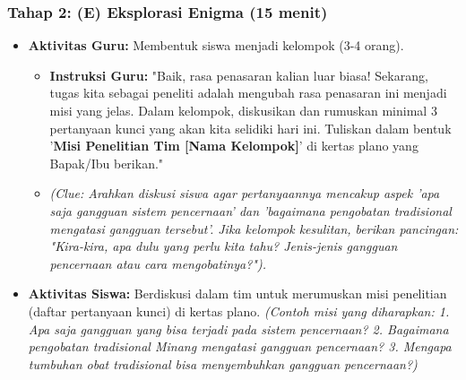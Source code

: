 \documentclass[a4paper,12pt]{article}
\begin{document}
\subsubsection{Tahap 2: (E) Eksplorasi Enigma (15 menit)}
\begin{itemize}
\item \textbf{Aktivitas Guru:} Membentuk siswa menjadi kelompok (3-4 orang).
    \begin{itemize}
    \item \textbf{Instruksi Guru:} "Baik, rasa penasaran kalian luar biasa! Sekarang, tugas kita sebagai peneliti adalah mengubah rasa penasaran ini menjadi misi yang jelas. Dalam kelompok, diskusikan dan rumuskan minimal 3 pertanyaan kunci yang akan kita selidiki hari ini. Tuliskan dalam bentuk '\textbf{Misi Penelitian Tim [Nama Kelompok]}' di kertas plano yang Bapak/Ibu berikan."
    \item \textit{(Clue: Arahkan diskusi siswa agar pertanyaannya mencakup aspek 'apa saja gangguan sistem pencernaan' dan 'bagaimana pengobatan tradisional mengatasi gangguan tersebut'. Jika kelompok kesulitan, berikan pancingan: "Kira-kira, apa dulu yang perlu kita tahu? Jenis-jenis gangguan pencernaan atau cara mengobatinya?").}
    \end{itemize}
\item \textbf{Aktivitas Siswa:} Berdiskusi dalam tim untuk merumuskan misi penelitian (daftar pertanyaan kunci) di kertas plano. \textit{(Contoh misi yang diharapkan: 1. Apa saja gangguan yang bisa terjadi pada sistem pencernaan? 2. Bagaimana pengobatan tradisional Minang mengatasi gangguan pencernaan? 3. Mengapa tumbuhan obat tradisional bisa menyembuhkan gangguan pencernaan?)}
\end{itemize}
\end{document}
